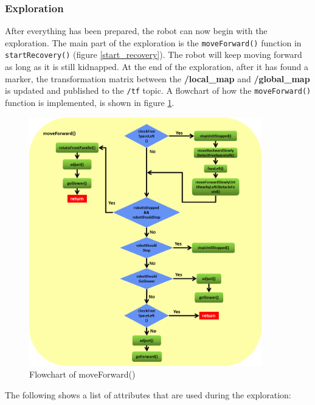 \subsubsection{Exploration} \label{subsection:implementation_exploration}

After everything has been prepared, the robot can now begin with the exploration. The main part of the exploration is the \texttt{moveForward()} function in \texttt{startRecovery()} (figure \ref{start_recovery}). The robot will keep moving forward as long as it is still kidnapped. At the end of the exploration, after it has found a marker, the transformation matrix between the \textbf{/local\_map} and \textbf{/global\_map} is updated and published to the \texttt{/tf} topic. A flowchart of how the \texttt{moveForward()} function is implemented, is shown in figure \ref{move_forward}.

\begin{figure}[htb]
\centering
\includegraphics[width=0.9\textwidth]{graphics/move_forward.png}
\caption{Flowchart of moveForward()}
\label{move_forward}
\centering
\end{figure}

The following shows a list of attributes that are used during the exploration:

